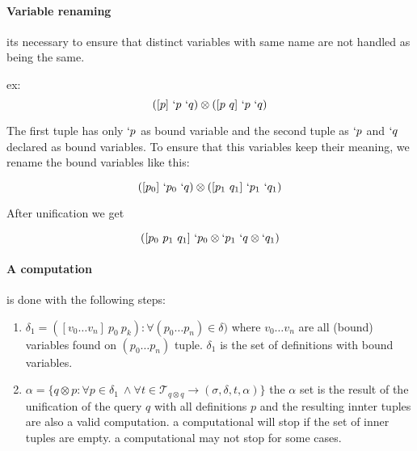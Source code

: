 \documentclass[11pt,a4paper]{report}
\newcommand{\var}[1]{`#1}
\newcommand{\unify}{\otimes}
\begin{document}
\paragraph{Variable renaming} its necessary to ensure that distinct variables with same name are not handled as being the same.

ex:
\[
    ([p]\ \var{p}\ \var{q}) \unify ([p\ q]\ \var{p}\ \var{q})
\]

The first tuple has only $\var{p}$ as bound variable and the second tuple as $\var{p}$ and $\var{q}$ declared as bound variables.
To ensure that this variables keep their meaning, we rename the bound variables like this:

\[
    ([p_{0}]\ \var{p_{0}}\ \var{q}) \unify ([p_{1}\ q_{1}]\ \var{p_{1}}\ \var{q_{1}})
\]

After unification we get

\[
    ([p_{0}\ p_{1}\ q_{1}]\ \var{p_{0}} \unify \var{p_{1}}\ \var{q} \unify \var{q_{1}})
\]


\paragraph{A computation} is done with the following steps:

\begin{enumerate}
    \item $\delta_{1} = { ([v_{0} \ldots v_{n}]\ p_{0}\ p_{k}): \forall (p_{0} \ldots p_{n}) \in \delta)}$
    \subitem where $v_{0} \ldots v_{n}$ are all (bound) variables found on $(p_{0} \ldots p_{n})$ tuple.
    \subitem $\delta_{1}$ is the set of definitions with bound variables.
    \item $\alpha = \{q \unify p :\forall p \in \delta_{1}\ \wedge \forall t \in \mathcal{T}_{q \unify q} \rightarrow (\sigma, \delta, t, \alpha) \}$
    \subitem the $\alpha$ set is the result of the unification of the query $q$ with all definitions $p$ and the resulting innter tuples are
    also a valid computation.
    \subitem a computational will stop if the set of inner tuples are empty.
    \subitem a computational may not stop for some cases.
\end{enumerate}
\end{document}
